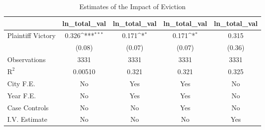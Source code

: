 \begin{table}[htbp]\centering
\def\sym#1{\ifmmode^{#1}\else\(^{#1}\)\fi}
\caption{Estimates of the Impact of Eviction}
\begin{tabular}{l*{4}{c}}
\toprule
                    &\multicolumn{1}{c}{ln\_total\_val}&\multicolumn{1}{c}{ln\_total\_val}&\multicolumn{1}{c}{ln\_total\_val}&\multicolumn{1}{c}{ln\_total\_val}\\
\midrule
Plaintiff Victory   &       0.326\sym{***}&       0.171\sym{*}  &       0.171\sym{*}  &       0.315         \\
                    &      (0.08)         &      (0.07)         &      (0.07)         &      (0.36)         \\
\midrule
Observations        &        3331         &        3331         &        3331         &        3331         \\
$\text{R}^2$        &     0.00510         &       0.321         &       0.321         &       0.325         \\
City F.E.           &          No         &         Yes         &         Yes         &          No         \\
Year F.E.           &          No         &         Yes         &         Yes         &          No         \\
Case Controls       &          No         &          No         &         Yes         &          No         \\
I.V. Estimate       &          No         &          No         &          No         &         Yes         \\
\bottomrule
\end{tabular}
\end{table}
